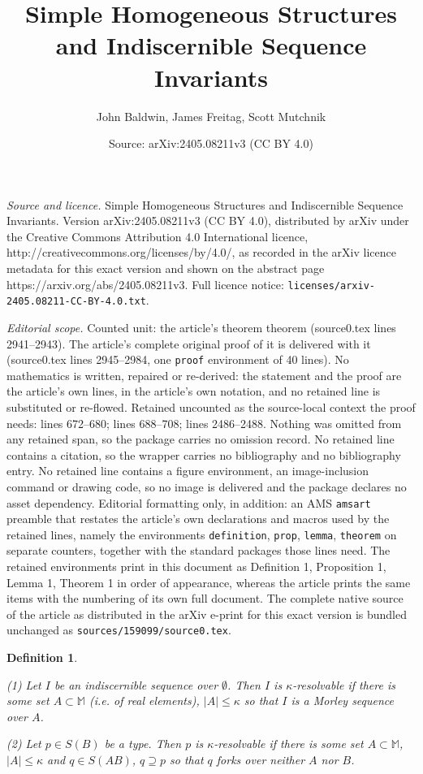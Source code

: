 \documentclass[10pt,a4paper]{amsart}
\title{Simple Homogeneous Structures and Indiscernible Sequence Invariants}
\author{John Baldwin, James Freitag, Scott Mutchnik}
\date{Source: arXiv:2405.08211v3 (CC BY 4.0)}
\newtheorem{definition}{Definition}
\begin{document}
\maketitle

\noindent\emph{Source and licence.} Simple Homogeneous Structures and Indiscernible Sequence Invariants. Version arXiv:2405.08211v3 (CC BY 4.0), distributed by arXiv under the Creative Commons Attribution 4.0 International licence, http://creativecommons.org/licenses/by/4.0/, as recorded in the arXiv licence metadata for this exact version and shown on the abstract page https://arxiv.org/abs/2405.08211v3. Full licence notice: \texttt{licenses/arxiv-2405.08211-CC-BY-4.0.txt}.\par\smallskip

\noindent\textit{Editorial scope.} Counted unit: the article's theorem theorem (source0.tex lines 2941--2943). The article's complete original proof of it is delivered with it (source0.tex lines 2945--2984, one \texttt{proof} environment of 40 lines). No mathematics is written, repaired or re-derived: the statement and the proof are the article's own lines, in the article's own notation, and no retained line is substituted or re-flowed.  Retained uncounted as the source-local context the proof needs: lines 672--680; lines 688--708; lines 2486--2488.  Nothing was omitted from any retained span, so the package carries no omission record.  No retained line contains a citation, so the wrapper carries no bibliography and no bibliography entry.  No retained line contains a figure environment, an image-inclusion command or drawing code, so no image is delivered and the package declares no asset dependency.  Editorial formatting only, in addition: an AMS \texttt{amsart} preamble that restates the article's own declarations and macros used by the retained lines, namely the environments \texttt{definition}, \texttt{prop}, \texttt{lemma}, \texttt{theorem} on separate counters, together with the standard packages those lines need.  The retained environments print in this document as Definition 1, Proposition 1, Lemma 1, Theorem 1 in order of appearance, whereas the article prints the same items with the numbering of its own full document.  The complete native source of the article as distributed in the arXiv e-print for this exact version is bundled unchanged as \texttt{sources/159099/source0.tex}.
\begin{definition}
   \label{resolvable}
    
    (1) Let $I$ be an indiscernible sequence over $\emptyset$. Then $I$ is \emph{$\kappa$-resolvable} if there is some set $A \subset \mathbb{M}$ (i.e. of real elements), $|A| \leq \kappa$ so that $I$ is a Morley sequence over $A$.
   
    (2) Let $p \in S(B)$ be a type. Then $p$ is \emph{$\kappa$-resolvable} if there is some set $A \subset \mathbb{M}$, $|A| \leq \kappa$ and $ q \in S(AB)$, $q \supseteq p$ so that $q$ forks over neither $A$ nor $B$.

    
\end{definition}
\end{document}
